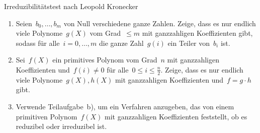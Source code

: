 \documentclass{algblatt}
\begin{document}
\begin{aufgabe}{Irreduzibilitätstest nach Leopold Kronecker}
\begin{enumerate}
\item Seien~$b_0,\ldots,b_m$ von Null verschiedene ganze Zahlen. Zeige, dass es
nur endlich viele Polynome~$g(X)$ vom Grad~$\leq m$ mit ganzzahligen Koeffizienten
gibt, sodass für alle~$i = 0,\ldots,m$ die ganze Zahl~$g(i)$ ein Teiler
von~$b_i$ ist.
\item Sei~$f(X)$ ein primitives Polynom vom Grad~$n$ mit ganzzahligen
Koeffizienten und~$f(i) \neq 0$ für alle~$0 \leq i \leq \frac{n}{2}$. Zeige,
dass es nur endlich viele Polynome~$g(X), h(X)$ mit ganzzahligen Koeffizienten
und~$f = g \cdot h$ gibt.
\item Verwende Teilaufgabe~b), um ein Verfahren anzugeben, das von einem
primitiven Polynom~$f(X)$ mit ganzzahligen Koeffizienten feststellt, ob es
reduzibel oder irreduzibel ist.
\end{enumerate}
\end{aufgabe}
\end{document}
